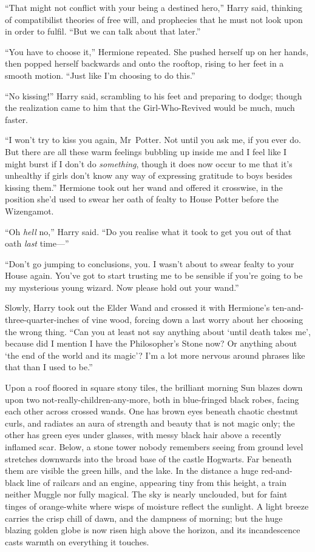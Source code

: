 “That might not conflict with your being a destined hero,” Harry said, thinking of compatibilist theories of free will, and prophecies that he must not look upon in order to fulfil. “But we can talk about that later.”

“You have to choose it,” Hermione repeated. She pushed herself up on her hands, then popped herself backwards and onto the rooftop, rising to her feet in a smooth motion. “Just like I’m choosing to do this.”

“No kissing!” Harry said, scrambling to his feet and preparing to dodge; though the realization came to him that the Girl-Who-Revived would be much, much faster.

“I won’t try to kiss you again, Mr~Potter. Not until you ask me, if you ever do. But there are all these warm feelings bubbling up inside me and I feel like I might burst if I don’t do \emph{something}, though it does now occur to me that it’s unhealthy if girls don’t know any way of expressing gratitude to boys besides kissing them.” Hermione took out her wand and offered it crosswise, in the position she’d used to swear her oath of fealty to House Potter before the Wizengamot.

“Oh \emph{hell} no,” Harry said. “Do you realise what it took to get you out of that oath \emph{last} time—”

“Don’t go jumping to conclusions, you. I wasn’t about to swear fealty to your House again. You’ve got to start trusting me to be sensible if you’re going to be my mysterious young wizard. Now please hold out your wand.”

Slowly, Harry took out the Elder Wand and crossed it with Hermione’s ten-and-three-quarter-inches of vine wood, forcing down a last worry about her choosing the wrong thing. “Can you at least not say anything about ‘until death takes me’, because did I mention I have the Philosopher’s Stone now? Or anything about ‘the end of the world and its magic’? I’m a lot more nervous around phrases like that than I used to be.”

\later

Upon a roof floored in square stony tiles, the brilliant morning Sun blazes down upon two not-really-children-any-more, both in blue-fringed black robes, facing each other across crossed wands. One has brown eyes beneath chaotic chestnut curls, and radiates an aura of strength and beauty that is not magic only; the other has green eyes under glasses, with messy black hair above a recently inflamed scar. Below, a stone tower nobody remembers seeing from ground level stretches downwards into the broad base of the castle Hogwarts. Far beneath them are visible the green hills, and the lake. In the distance a huge red-and-black line of railcars and an engine, appearing tiny from this height, a train neither Muggle nor fully magical. The sky is nearly unclouded, but for faint tinges of orange-white where wisps of moisture reflect the sunlight. A light breeze carries the crisp chill of dawn, and the dampness of morning; but the huge blazing golden globe is now risen high above the horizon, and its incandescence casts warmth on everything it touches.

